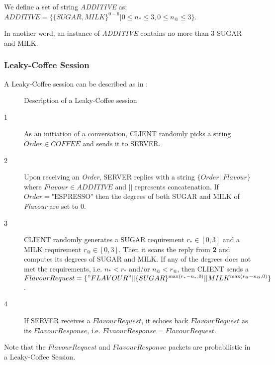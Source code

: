 \begin{definition}
We define a set of string \textit{ADDITIVE} as:\\
$ADDITIVE = \{\{ SUGAR, MILK \}^{0 - 6} | 0 \leq n_{*} \leq 3, 0 \leq n_{@} \leq 3 \}$.

In another word, an instance of \textit{ADDITIVE} contains no more than 3 SUGAR and MILK.
\end{definition}

\subsubsection{Leaky-Coffee Session}
A Leaky-Coffee session can be described as in :

\begin{figure}[H]
\centering
\resizebox{10cm}{!}
{}
\caption{Description of a Leaky-Coffee session}
\label{Fig: Leaky-Coffee Session}
\end{figure}

\begin{description}
\item[1] As an initiation of a conversation, CLIENT randomly picks a string $Order \in COFFEE$ and sends it to SERVER.

\item[2] Upon receiving an \textit{Order}, SERVER replies with a string $\{Order || Flavour\}$ where $Flavour \in ADDITIVE$ and $||$ represents concatenation. If $Order = \text{"ESPRESSO"}$ then the degrees of both SUGAR and MILK of \textit{Flavour} are set to $0$.

\item[3] CLIENT randomly generates a SUGAR requirement $r_* \in [0, 3]$ and a MILK requirement $r_@ \in [0,3]$. Then it scans the reply from \textbf{2} and computes its degrees of SUGAR and MILK. If any of the degrees does not  met the requirements, i.e. $n_* < r_*$ and/or $n_@ < r_@$, then CLIENT sends a $ FlavourRequest = \{"FLAVOUR"||\{SUGAR\}^{\max({r_* - n_*,0})} || MILK^{\max(r_@ -  n_@, 0)} \} $.

\item[4] If SERVER receives a $FlavourRequest$, it echoes back $FlavourRequest$ as its $FlavourResponse$, i.e. $FlvaourResponse = FlavourRequest$.	
\end{description}

Note that the $FlavourRequest$ and $FlavourResponse$ packets are probabilistic in a Leaky-Coffee Session.

